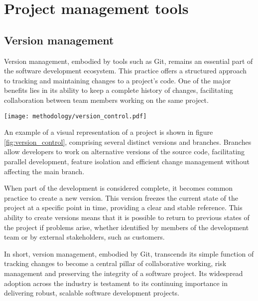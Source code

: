 \section{Project management tools}

\subsection{Version management}
Version management, embodied by tools such as Git, remains an essential part of the software development ecosystem. This practice offers a structured approach to tracking and maintaining changes to a project's code. One of the major benefits lies in its ability to keep a complete history of changes, facilitating collaboration between team members working on the same project.
\begin{center}
    \begingroup
    \texttt{[image: methodology/version\_control.pdf]}
    \label{fig:version_control}
    \endgroup
\end{center}
An example of a visual representation of a project is shown in figure \ref{fig:version_control}, comprising several distinct versions and branches. Branches allow developers to work on alternative versions of the source code, facilitating parallel development, feature isolation and efficient change management without affecting the main branch.

When part of the development is considered complete, it becomes common practice to create a new version. This version freezes the current state of the project at a specific point in time, providing a clear and stable reference. This ability to create versions means that it is possible to return to previous states of the project if problems arise, whether identified by members of the development team or by external stakeholders, such as customers.

In short, version management, embodied by Git, transcends its simple function of tracking changes to become a central pillar of collaborative working, risk management and preserving the integrity of a software project. Its widespread adoption across the industry is testament to its continuing importance in delivering robust, scalable software development projects.

